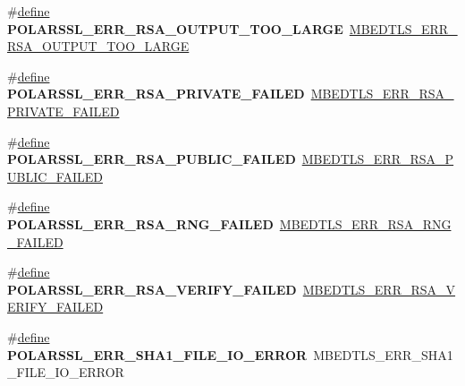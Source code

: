 \begin{DoxyCompactItemize}
\item 
\mbox{\label{compat-1_83_8h_a1eb1e554a1fbed5abf93c566bc7751be}} 
\#\hyperlink{structdefine}{define} {\bfseries P\+O\+L\+A\+R\+S\+S\+L\+\_\+\+E\+R\+R\+\_\+\+R\+S\+A\+\_\+\+O\+U\+T\+P\+U\+T\+\_\+\+T\+O\+O\+\_\+\+L\+A\+R\+GE}~\hyperlink{rsa_8h_a2d3d26a305009e5b26957e21b6b151c9}{M\+B\+E\+D\+T\+L\+S\+\_\+\+E\+R\+R\+\_\+\+R\+S\+A\+\_\+\+O\+U\+T\+P\+U\+T\+\_\+\+T\+O\+O\+\_\+\+L\+A\+R\+GE}
\item 
\mbox{\label{compat-1_83_8h_a44f5543dce7fc29b240a516e68acd019}} 
\#\hyperlink{structdefine}{define} {\bfseries P\+O\+L\+A\+R\+S\+S\+L\+\_\+\+E\+R\+R\+\_\+\+R\+S\+A\+\_\+\+P\+R\+I\+V\+A\+T\+E\+\_\+\+F\+A\+I\+L\+ED}~\hyperlink{rsa_8h_af7ddb312b48f8cd135150fc9bbb791d0}{M\+B\+E\+D\+T\+L\+S\+\_\+\+E\+R\+R\+\_\+\+R\+S\+A\+\_\+\+P\+R\+I\+V\+A\+T\+E\+\_\+\+F\+A\+I\+L\+ED}
\item 
\mbox{\label{compat-1_83_8h_a6f6e6c330a1005f0846c4d033b49558c}} 
\#\hyperlink{structdefine}{define} {\bfseries P\+O\+L\+A\+R\+S\+S\+L\+\_\+\+E\+R\+R\+\_\+\+R\+S\+A\+\_\+\+P\+U\+B\+L\+I\+C\+\_\+\+F\+A\+I\+L\+ED}~\hyperlink{rsa_8h_ae9bffdb461c7e5803b4081ddd745afb5}{M\+B\+E\+D\+T\+L\+S\+\_\+\+E\+R\+R\+\_\+\+R\+S\+A\+\_\+\+P\+U\+B\+L\+I\+C\+\_\+\+F\+A\+I\+L\+ED}
\item 
\mbox{\label{compat-1_83_8h_a07f72608ba6249132c9a6cf497f0371d}} 
\#\hyperlink{structdefine}{define} {\bfseries P\+O\+L\+A\+R\+S\+S\+L\+\_\+\+E\+R\+R\+\_\+\+R\+S\+A\+\_\+\+R\+N\+G\+\_\+\+F\+A\+I\+L\+ED}~\hyperlink{rsa_8h_a6aa8ac62f7c3079cba7da3250a2fb7af}{M\+B\+E\+D\+T\+L\+S\+\_\+\+E\+R\+R\+\_\+\+R\+S\+A\+\_\+\+R\+N\+G\+\_\+\+F\+A\+I\+L\+ED}
\item 
\mbox{\label{compat-1_83_8h_a6c8054af82b411547c45248cc684609b}} 
\#\hyperlink{structdefine}{define} {\bfseries P\+O\+L\+A\+R\+S\+S\+L\+\_\+\+E\+R\+R\+\_\+\+R\+S\+A\+\_\+\+V\+E\+R\+I\+F\+Y\+\_\+\+F\+A\+I\+L\+ED}~\hyperlink{rsa_8h_a334c537fbd9e49eb37a2ff12a11392cd}{M\+B\+E\+D\+T\+L\+S\+\_\+\+E\+R\+R\+\_\+\+R\+S\+A\+\_\+\+V\+E\+R\+I\+F\+Y\+\_\+\+F\+A\+I\+L\+ED}
\item 
\mbox{\label{compat-1_83_8h_a71eaf8aa36e347940b9132e7882b9bf4}} 
\#\hyperlink{structdefine}{define} {\bfseries P\+O\+L\+A\+R\+S\+S\+L\+\_\+\+E\+R\+R\+\_\+\+S\+H\+A1\+\_\+\+F\+I\+L\+E\+\_\+\+I\+O\+\_\+\+E\+R\+R\+OR}~M\+B\+E\+D\+T\+L\+S\+\_\+\+E\+R\+R\+\_\+\+S\+H\+A1\+\_\+\+F\+I\+L\+E\+\_\+\+I\+O\+\_\+\+E\+R\+R\+OR

\end{DoxyCompactItemize}
